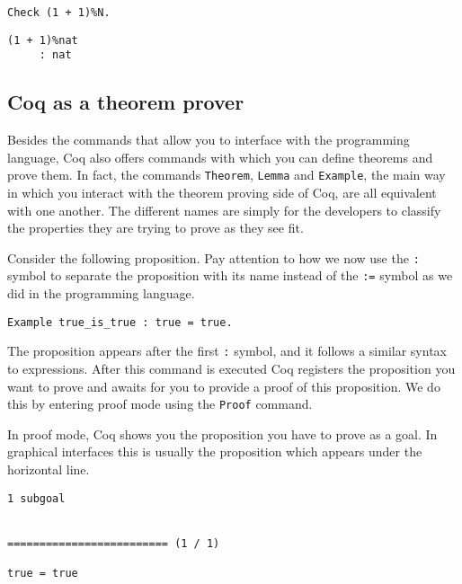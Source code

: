\begin{verbatim}
Check (1 + 1)%N. 
\end{verbatim}
\vspace{-\baselineskip*3/2}
\begin{verbatim}
(1 + 1)%nat
     : nat
\end{verbatim}



\subsection{Coq as a theorem prover}
\label{sect:coq-proof-assistant}

Besides the commands that allow you to interface with the programming language, Coq also offers commands
with which you can define theorems and prove them. In fact, the commands \texttt{Theorem}, 
\texttt{Lemma} and \texttt{Example}, the main way in which you interact with the 
theorem proving side of Coq, are all equivalent with one another. The different names are simply for the 
developers to classify the properties they are trying to prove as they see fit.

Consider the following proposition. Pay attention to how we now use the \texttt{:} symbol to separate the 
proposition with its name instead of the \texttt{:=} symbol as we did in the programming language.

\begin{verbatim}
Example true_is_true : true = true.
\end{verbatim}

The proposition appears after the first \texttt{:} symbol, and it follows a similar syntax 
to expressions. %
After this command is executed Coq registers the proposition you want to prove and awaits for you
to provide a proof of this proposition. We do this by entering proof mode using the 
\texttt{Proof} command.

In proof mode, Coq shows you the proposition you have to prove as a goal. In graphical interfaces this
is usually the proposition which appears under the horizontal line.

\begin{verbatim}
1 subgoal


========================= (1 / 1)

true = true
\end{verbatim}

